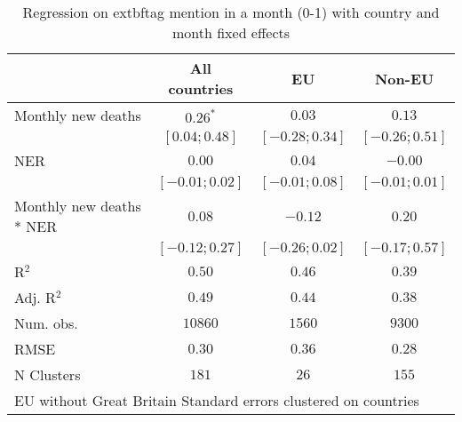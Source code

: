 
\begin{table}
\caption{Regression on 	extbf{tag mention in a month (0-1)} with country and month fixed effects}
\begin{center}
\begin{tabular}{l c c c}
\hline
 & All countries & EU & Non-EU \\
\hline
Monthly new deaths       & $0.26^{*}$       & $0.03$           & $0.13$           \\
                         & $ [ 0.04; 0.48]$ & $ [-0.28; 0.34]$ & $ [-0.26; 0.51]$ \\
NER                      & $0.00$           & $0.04$           & $-0.00$          \\
                         & $ [-0.01; 0.02]$ & $ [-0.01; 0.08]$ & $ [-0.01; 0.01]$ \\
Monthly new deaths * NER & $0.08$           & $-0.12$          & $0.20$           \\
                         & $ [-0.12; 0.27]$ & $ [-0.26; 0.02]$ & $ [-0.17; 0.57]$ \\
\hline
R$^2$                    & $0.50$           & $0.46$           & $0.39$           \\
Adj. R$^2$               & $0.49$           & $0.44$           & $0.38$           \\
Num. obs.                & $10860$          & $1560$           & $9300$           \\
RMSE                     & $0.30$           & $0.36$           & $0.28$           \\
N Clusters               & $181$            & $26$             & $155$            \\
\hline
\multicolumn{4}{l}{\scriptsize{EU without Great Britain
 Standard errors clustered on countries}}
\end{tabular}
\label{table:coefficients}
\end{center}
\end{table}
